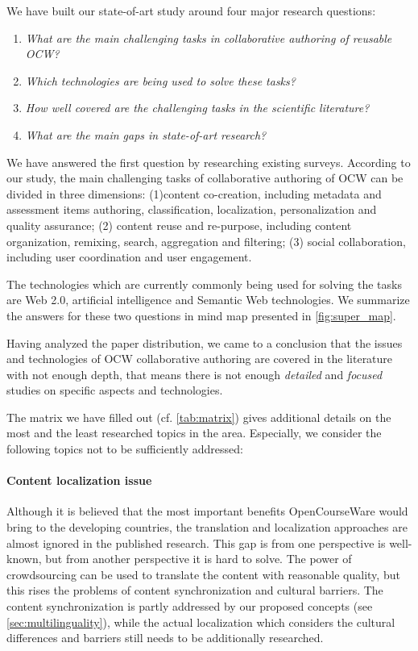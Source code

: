 \documentclass[ngerman,UKenglish,table]{scrbook}
\begin{document}
We have built our state-of-art study around four major research questions:
\begin{enumerate}

\item \emph{What are the main challenging tasks in collaborative authoring of reusable OCW?}
\item \emph{Which technologies are being used to solve these tasks?}
\item \emph{How well covered are the challenging tasks in the scientific literature?}
\item \emph{What are the main gaps in state-of-art research?}

\end{enumerate}


We have answered the first question by researching existing surveys.
According to our study, the main challenging tasks of collaborative authoring of OCW can be divided in three dimensions: (1)content co-creation, including metadata and assessment items authoring, classification, localization, personalization and quality assurance; (2) content reuse and re-purpose, including content organization, remixing, search, aggregation and filtering; (3) social collaboration, including user coordination and user engagement.

The technologies which are currently commonly being used for solving the tasks are Web 2.0, artificial intelligence and Semantic Web technologies.
We summarize the answers for these two questions in mind map presented in \autoref{fig:super_map}.

Having analyzed the paper distribution, we came to a conclusion that the issues and technologies of OCW collaborative authoring are covered in the literature with not enough depth, that means there is not enough \emph{detailed} and \emph{focused} studies on specific aspects and technologies.

The matrix we have filled out (cf. \autoref{tab:matrix}) gives additional details on the most and the least researched topics in the area.
Especially, we consider the following topics not to be sufficiently addressed: 

\paragraph{Content localization issue}
Although it is believed that the most important benefits OpenCourseWare would bring to the developing countries, the translation and localization approaches are almost ignored in the published research.
This gap is from one perspective is well-known, but from another perspective it is hard to solve.
The power of crowdsourcing can be used to translate the content with reasonable quality, but this rises the problems of content synchronization and cultural barriers.
The content synchronization is partly addressed by our proposed concepts (see \autoref{sec:multilinguality}), while the actual localization which considers the cultural differences and barriers still needs to be additionally researched. 
\end{document}
